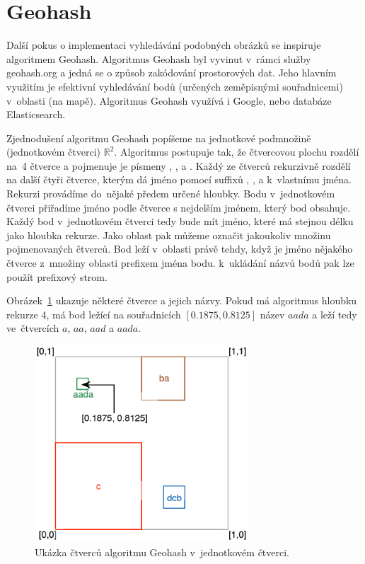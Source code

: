 \section{Geohash}
Další pokus o implementaci vyhledávání podobných obrázků se inspiruje algoritmem Geohash\cite{geohash}. Algoritmus Geohash byl vyvinut v~rámci služby geohash.org a jedná se o způsob zakódování prostorových dat. Jeho hlavním využitím je efektivní vyhledávání bodů (určených zeměpisnými souřadnicemi) v~oblasti (na mapě). Algoritmus Geohash využívá i Google, nebo databáze Elasticsearch.

Zjednodušení algoritmu Geohash popíšeme na jednotkové podmnožině (jednotkovém čtverci) $\mathbb{R}^2$. Algoritmus postupuje tak, že čtvercovou plochu rozdělí na~4 čtverce a pojmenuje je písmeny , ,  a . Každý ze čtverců rekurzivně rozdělí na další čtyři čtverce, kterým dá jméno pomocí suffixů , ,  a  k~vlastnímu jména. Rekurzi provádíme do~nějaké předem určené hloubky. Bodu v~jednotkovém čtverci přiřadíme jméno podle čtverce s nejdelším jménem, který bod obsahuje. Každý bod v~jednotkovém čtverci tedy bude mít jméno, které má stejnou délku jako hloubka rekurze. Jako oblast pak můžeme označit jakoukoliv množinu pojmenovaných čtverců. Bod leží v~oblasti právě tehdy, když je jméno nějakého čtverce z~množiny oblasti prefixem jména bodu. k~ukládání názvů bodů pak lze použít prefixový strom.

Obrázek~\ref{fig:geohash} ukazuje některé čtverce a jejich názvy. Pokud má algoritmus hloubku rekurze 4, má bod ležící na souřadnicích $[0.1875, 0.8125]$ název $aada$ a leží tedy ve~čtvercích $a$, $aa$, $aad$ a $aada$.


\begin{figure}[h]
  \centering
  \includegraphics[width=80mm]{geohash.eps}
  \caption{Ukázka čtverců algoritmu Geohash v~jednotkovém čtverci.}
  \label{fig:geohash}
\end{figure}

